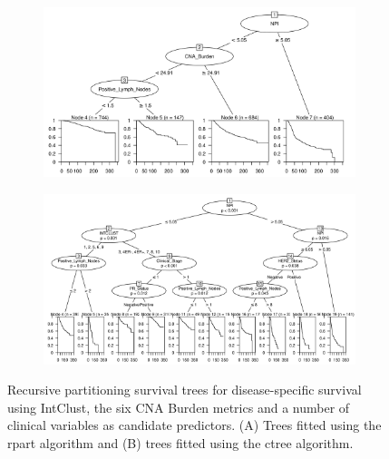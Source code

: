 \begin{figure}[!h]
\centering

\vspace{1cm}

\begin{subfigure}{\textwidth}
\subcaption{}
\includegraphics[width=1\textwidth]{../figures/Chapter_3/Clin_PartyKit_Survival_Burden_DSS_INTCLUST.png}
\end{subfigure}

\vspace{3cm}

\begin{subfigure}{\textwidth}
\subcaption{}
\includegraphics[width=1\textwidth]{../figures/Chapter_3/Clin_Ctree_Survival_Burden_DSS_INTCLUST.png}
\end{subfigure}

\vspace{1cm}

\caption[Recursive partitioning survival trees for disease-specific survival using IntClust the six CNA Burden metrics and a number of clinical variables as candidate predictors.]{Recursive partitioning survival trees for disease-specific survival using IntClust, the six CNA Burden metrics and a number of clinical variables as candidate predictors. (A) Trees fitted using the rpart algorithm and (B) trees fitted using the ctree algorithm.}
\label{fig:INTCLUST_CNA_Burden_DSS_Clin}
\end{figure}

